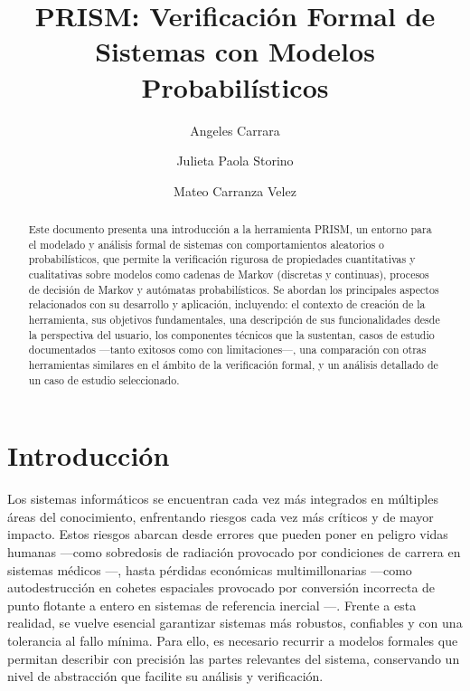\documentclass[runningheads]{llncs}
\begin{document}
\title{PRISM: Verificación Formal de Sistemas con Modelos Probabilísticos}

\author{
    Angeles Carrara\and
    Julieta Paola Storino\and
    Mateo Carranza Velez}



\maketitle

\begin{abstract}
Este documento presenta una introducción a la herramienta PRISM\cite{KNP11}, un entorno para el modelado y análisis formal de sistemas con comportamientos aleatorios o probabilísticos, que permite la verificación rigurosa de propiedades cuantitativas y cualitativas sobre modelos como cadenas de Markov (discretas y continuas), procesos de decisión de Markov y autómatas probabilísticos. Se abordan los principales aspectos relacionados con su desarrollo y aplicación, incluyendo: el contexto de creación de la herramienta, sus objetivos fundamentales, una descripción de sus funcionalidades desde la perspectiva del usuario, los componentes técnicos que la sustentan, casos de estudio documentados —tanto exitosos como con limitaciones—, una comparación con otras herramientas similares en el ámbito de la verificación formal, y un análisis detallado de un caso de estudio seleccionado.
\end{abstract}

\section{Introducción}

Los sistemas informáticos se encuentran cada vez más integrados en múltiples áreas del conocimiento, enfrentando riesgos cada vez más críticos y de mayor impacto. Estos riesgos abarcan desde errores que pueden poner en peligro vidas humanas —como sobredosis de radiación provocado por condiciones de carrera en sistemas médicos \cite{LT93}—, hasta pérdidas económicas multimillonarias —como autodestrucción en cohetes espaciales provocado por conversión incorrecta de punto flotante a entero en sistemas de referencia inercial \cite{Lan96}—. Frente a esta realidad, se vuelve esencial garantizar sistemas más robustos, confiables y con una tolerancia al fallo mínima. Para ello, es necesario recurrir a modelos formales que permitan describir con precisión las partes relevantes del sistema, conservando un nivel de abstracción que facilite su análisis y verificación.
\end{document}
